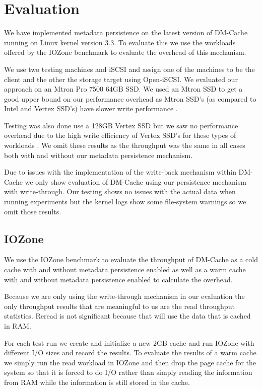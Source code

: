 \section{Evaluation}
\label{sec:evaluation}

We have implemented metadata persistence on the latest version of
DM-Cache running on Linux kernel version 3.3. To evaluate this we use
the workloads offered by the IOZone benchmark to evaluate the overhead
of this mechanism.

We use two testing machines and iSCSI and assign one of the machines
to be the client and the other the storage target using Open-iSCSI. We
evaluated our approach on an Mtron Pro 7500 64GB SSD. We used an Mtron
SSD to get a good upper bound on our performance overhead as Mtron
SSD's (as compared to Intel and Vertex SSD's) have slower write
performance \cite{FIOS}.

Testing was also done use a 128GB Vertex SSD but we saw no performance
overhead due to the high write efficiency of Vertex SSD's for these
types of workloads \cite{FIOS}. We omit these results as the
throughput was the same in all cases both with and without our
metadata persistence mechanism.

Due to issues with the implementation of the write-back mechanism
within DM-Cache we only show evaluation of DM-Cache using our
persistence mechanism with write-through. Our testing shows no issues
with the actual data when running experiments but the kernel logs show
some file-system warnings so we omit those results.

\subsection{IOZone}

We use the IOZone benchmark to evaluate the throughput of DM-Cache as
a cold cache with and without metadata persistence enabled as well as
a warm cache with and without metadata persistence enabled to
calculate the overhead.

Because we are only using the write-through mechanism in our
evaluation the only throughput results that are meaningful to us are
the read throughput statistics. Reread is not significant because that
will use the data that is cached in RAM.

For each test run we create and initialize a new 2GB cache and run
IOZone with different I/O sizes and record the results. To evaluate
the results of a warm cache we simply run the read workload in IOZone
and then drop the page cache for the system so that it is forced to do
I/O rather than simply reading the information from RAM while the
information is still stored in the cache.

